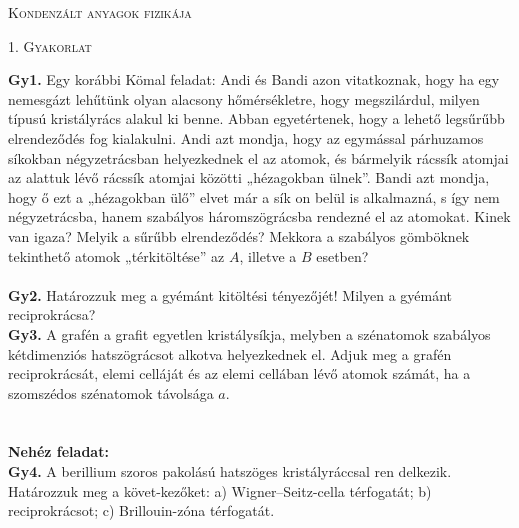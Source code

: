 \documentclass[12pt]{article}
\begin{document}
\centerline{
\textsc{\Large{ Kondenzált anyagok fizikája}}
}
\centerline{ 
\textsc{\large{1. Gyakorlat}}
}
\vspace{10mm}
\textbf{Gy1.} Egy korábbi Kömal feladat: Andi és Bandi azon vitatkoznak, hogy ha egy nemesgázt lehűtünk olyan alacsony hőmérsékletre, hogy megszilárdul, milyen típusú kristályrács alakul ki benne. Abban egyetértenek, hogy a lehető legsűrűbb elrendeződés fog kialakulni.
Andi azt mondja, hogy az egymással párhuzamos síkokban négyzetrácsban helyezkednek el az atomok, és bármelyik rácssík atomjai az alattuk lévő rácssík atomjai közötti „hézagokban ülnek”.
Bandi azt mondja, hogy ő ezt a „hézagokban ülő”  elvet már a sík
on belül is alkalmazná, s így nem négyzetrácsba, hanem szabályos háromszögrácsba rendezné el az atomokat.
Kinek van igaza? Melyik a sűrűbb elrendeződés? Mekkora a szabályos gömböknek tekinthető atomok „térkitöltése” az $A$, illetve a $B$ esetben?
\\
\\

\textbf{Gy2.} Határozzuk meg a gyémánt kitöltési tényezőjét! Milyen a gyémánt reciprokrácsa?
\\

\textbf{Gy3.} A grafén a grafit egyetlen kristálysíkja, melyben a szénatomok szabályos kétdimenziós hatszögrácsot alkotva helyezkednek el. Adjuk meg a grafén reciprokrácsát, elemi celláját és az elemi cellában lévő atomok számát, ha a szomszédos szénatomok távolsága $a$.
\\
\\\\
\textbf{Nehéz feladat:}
\\

\textbf{Gy4.} A berillium szoros pakolású hatszöges kristályráccsal ren
delkezik. Határozzuk meg a követ-kezőket:
a) Wigner–Seitz-cella térfogatát;
b) reciprokrácsot;
c) Brillouin-zóna térfogatát.
\end{document}
